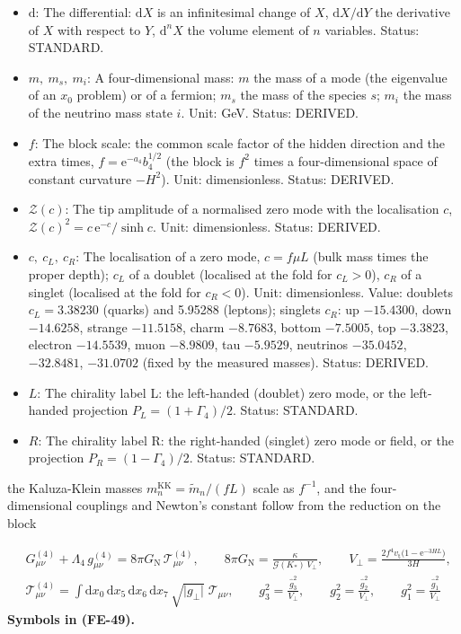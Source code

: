 \documentclass[
  10pt,
]{article}
\providecommand{\tightlist}{%
  \setlength{\itemsep}{0pt}\setlength{\parskip}{0pt}}
\begin{document}
\begin{itemize}
\tightlist
\item
  \(\mathrm{d}\): The differential: \(\mathrm{d}X\) is an infinitesimal
  change of \(X\), \(\mathrm{d}X/\mathrm{d}Y\) the derivative of \(X\)
  with respect to \(Y\), \(\mathrm{d}^nX\) the volume element of \(n\)
  variables. Status: STANDARD.
\item
  \(m,\ m_s,\ m_i\): A four-dimensional mass: \(m\) the mass of a mode
  (the eigenvalue of an \(x_0\) problem) or of a fermion; \(m_s\) the
  mass of the species \(s\); \(m_i\) the mass of the neutrino mass state
  \(i\). Unit: GeV. Status: DERIVED.
\item
  \(f\): The block scale: the common scale factor of the hidden
  direction and the extra times, \(f = \mathrm{e}^{-a_4}b_4^{1/2}\) (the
  block is \(f^2\) times a four-dimensional space of constant curvature
  \(-H^2\)). Unit: dimensionless. Status: DERIVED.
\item
  \(\mathcal{Z}(c)\): The tip amplitude of a normalised zero mode with
  the localisation \(c\),
  \(\mathcal{Z}(c)^2 = c\,\mathrm{e}^{-c}/\sinh c\). Unit:
  dimensionless. Status: DERIVED.
\item
  \(c,\ c_L,\ c_R\): The localisation of a zero mode, \(c = f\mu L\)
  (bulk mass times the proper depth); \(c_L\) of a doublet (localised at
  the fold for \(c_L > 0\)), \(c_R\) of a singlet (localised at the fold
  for \(c_R < 0\)). Unit: dimensionless. Value: doublets
  \(c_L = 3.38230\) (quarks) and 5.95288 (leptons); singlets \(c_R\): up
  \(-15.4300\), down \(-14.6258\), strange \(-11.5158\), charm
  \(-8.7683\), bottom \(-7.5005\), top \(-3.3823\), electron
  \(-14.5539\), muon \(-8.9809\), tau \(-5.9529\), neutrinos
  \(-35.0452\), \(-32.8481\), \(-31.0702\) (fixed by the measured
  masses). Status: DERIVED.
\item
  \(L\): The chirality label L: the left-handed (doublet) zero mode, or
  the left-handed projection \(P_L = (1 + \Gamma_4)/2\). Status:
  STANDARD.
\item
  \(R\): The chirality label R: the right-handed (singlet) zero mode or
  field, or the projection \(P_R = (1 - \Gamma_4)/2\). Status: STANDARD.
\end{itemize}

the Kaluza-Klein masses \(m^{\mathrm{KK}}_n = \tilde m_n/(fL)\) scale as
\(f^{-1}\), and the four-dimensional couplings and Newton's constant
follow from the reduction on the block

\[
\begin{aligned}
&G^{(4)}_{\mu\nu} + \Lambda_4\,g^{(4)}_{\mu\nu} = 8\pi G_{\mathrm{N}}\,\mathcal{T}^{(4)}_{\mu\nu},\qquad
 8\pi G_{\mathrm{N}} = \frac{\kappa}{\mathcal{G}(K_*)\,V_\perp},\qquad V_\perp =
 \frac{2f^4v_{\mathrm{t}}\big(1 - \mathrm{e}^{-3HL}\big)}{3H},\\
&\mathcal{T}^{(4)}_{\mu\nu} =
 \int\mathrm{d}x_0\,\mathrm{d}x_5\,\mathrm{d}x_6\,\mathrm{d}x_7\,\sqrt{\lvert
 g_\perp\rvert}\;\mathcal{T}_{\mu\nu},
 \qquad g_3^2 = \frac{\hat g_3^2}{V_\perp},\qquad g_2^2 = \frac{\hat g_2^2}{V_\perp},\qquad g_1^2 =
 \frac{\hat g_1^2}{V_\perp}
\end{aligned} \tag{FE-49}
\] \textbf{Symbols in (FE-49).}
\end{document}
